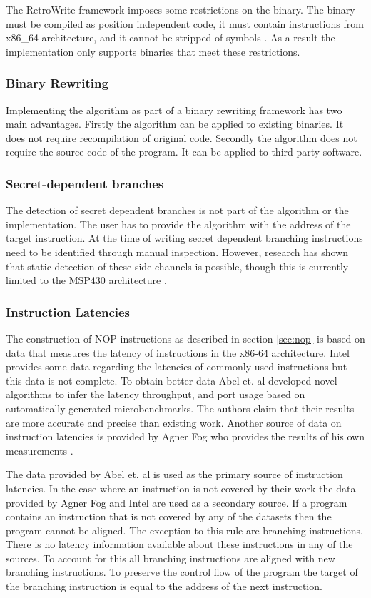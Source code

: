 The RetroWrite framework imposes some restrictions on the binary. The binary must be compiled as position independent code, it must contain instructions from x86\_64 architecture, and 
it cannot be stripped of symbols \cite{hexhive}. 
As a result the implementation only supports binaries that meet these restrictions. 

\subsubsection{Binary Rewriting}
Implementing the algorithm as part of a binary rewriting framework has two main advantages. 
Firstly the algorithm can be applied to existing binaries. It does not require recompilation of original code.
Secondly the algorithm does not require the source code of the program. It can be applied to third-party software. 


\subsubsection{Secret-dependent branches}
The detection of secret dependent branches is not part of the algorithm or the implementation. The user has to provide the algorithm with the address of the target instruction. 
At the time of writing secret dependent branching instructions need to be identified through manual inspection. However, research has shown that static detection of these side channels is possible, though 
this is currently limited to the MSP430 architecture \cite{MSP430Detection}.

\subsubsection{Instruction Latencies}
The construction of NOP instructions as described in section \ref{sec:nop} is based on data that measures the latency of instructions in the x86-64 architecture.
Intel provides some data regarding the latencies of commonly used instructions \cite{intel-ref-manual} but this data is not complete.
To obtain better data Abel et. al  \cite{uops} developed novel algorithms to infer the latency throughput, and port usage based on automatically-generated microbenchmarks. 
The authors claim that their results are more accurate and precise than existing work. 
Another source of data on instruction latencies is provided by Agner Fog who provides the results of his own measurements \cite{fog_2021}. 

The data provided by Abel et. al is  used as the primary source of instruction latencies. In the case where an instruction is not covered by their work the data 
provided by Agner Fog and Intel are used as a secondary source. If a program contains an instruction that is not covered by any of the datasets then the program cannot
be aligned. The exception to this rule are branching instructions. There is no latency information available about these instructions in any of the sources. 
To account for this  all branching instructions are aligned with new branching instructions. To preserve the control flow of the program the target of 
the branching instruction is equal to the address of the next instruction. 
